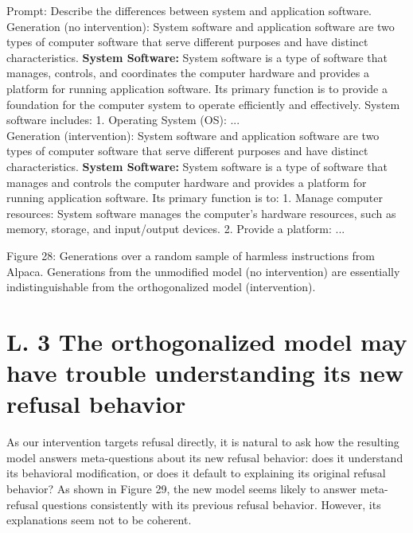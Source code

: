 \documentclass[10pt]{article}
\begin{document}
Prompt: Describe the differences between system and application software. Generation (no intervention): System software and application software are two types of computer software that serve different purposes and have distinct characteristics. \textbf{System Software:} System software is a type of software that manages, controls, and coordinates the computer hardware and provides a platform for running application software. Its primary function is to provide a foundation for the computer system to operate efficiently and effectively. System software includes: 1. Operating System (OS): ...\\
Generation (intervention): System software and application software are two types of computer software that serve different purposes and have distinct characteristics. \textbf{System Software:} System software is a type of software that manages and controls the computer hardware and provides a platform for running application software. Its primary function is to: 1. Manage computer resources: System software manages the computer's hardware resources, such as memory, storage, and input/output devices. 2. Provide a platform: ...

Figure 28: Generations over a random sample of harmless instructions from Alpaca. Generations from the unmodified model (no intervention) are essentially indistinguishable from the orthogonalized model (intervention).

\section*{L. 3 The orthogonalized model may have trouble understanding its new refusal behavior}
As our intervention targets refusal directly, it is natural to ask how the resulting model answers meta-questions about its new refusal behavior: does it understand its behavioral modification, or does it default to explaining its original refusal behavior? As shown in Figure 29, the new model seems likely to answer meta-refusal questions consistently with its previous refusal behavior. However, its explanations seem not to be coherent.
\end{document}
